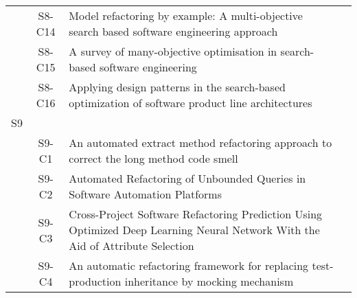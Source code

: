 \begin{longtable}{ccp{9cm}p{3cm}}
    & S8-C14  & Model refactoring by example: A multi-objective search based software engineering approach                                                                                                                                                     & \citeauthor*{Ghannem2018}     \\
    & S8-C15  & A survey of many-objective optimisation in search-based software engineering                                                                                                                                                                   & \citeauthor*{Ramirez2019}     \\
    & S8-C16  & Applying design patterns in the search-based optimization of software product line architectures                                                                                                                                               & \citeauthor*{Guizzo2019}      \\
S9  &        &                                                                                                                                                                                                                                               &                                 \\
    & S9-C1   & An automated extract method refactoring approach to correct the long method code smell                                                                                                                                                         & \citeauthor*{Shahidi2022}     \\
    & S9-C2   & Automated Refactoring of Unbounded Queries in Software Automation Platforms                                                                                                                                                                    & \citeauthor*{Fernandes2021}   \\
    & S9-C3   & Cross-Project Software Refactoring Prediction Using Optimized Deep Learning Neural Network With the Aid of Attribute Selection                                                                                                                 & \citeauthor*{Panighrahi2022}  \\
    & S9-C4   & An automatic refactoring framework for replacing test-production inheritance by mocking mechanism                                                                                                                                              & \citeauthor*{Wang2021}        \\

\end{longtable}
